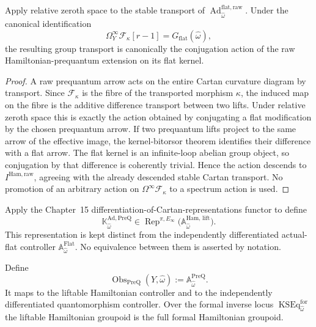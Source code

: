 \begin{proposition}
\label{prop:prequantum-flat-adjoint-conjugation-comparison}
Apply relative zeroth space to the stable transport of
$\operatorname{Ad}^{\mathrm{flat,raw}}_{\widehat\omega}$.  Under the canonical
identification
\[
\Omega_Y^\infty\mathscr F_\kappa[r-1]
=G_{\mathrm{flat}}(\widehat\omega),
\]
the resulting group transport is canonically the conjugation action of the raw
Hamiltonian-prequantum extension on its flat kernel.
\end{proposition}

\begin{proof}
A raw prequantum arrow acts on the entire Cartan curvature diagram by transport.
Since $\mathscr F_\kappa$ is the fibre of the transported morphism $\kappa$, the
induced map on the fibre is the additive difference transport between two lifts.
Under relative zeroth space this is exactly the action obtained by conjugating a
flat modification by the chosen prequantum arrow.  If two prequantum lifts project
to the same arrow of the effective image, the kernel-bitorsor theorem identifies
their difference with a flat arrow.  The flat kernel is an infinite-loop abelian
group object, so conjugation by that difference is coherently trivial.  Hence the
action descends to $I^{\mathrm{Ham,raw}}$, agreeing with the already descended
stable Cartan transport.  No promotion of an arbitrary action on
$\Omega^\infty\mathscr F_\kappa$ to a spectrum action is used.
\end{proof}

\begin{definition}
\label{constr:prequantum-tangent-representation}
Apply the Chapter~15 differentiation-of-Cartan-representations functor to define
\[
\boxed{
\mathbb K_{\widehat\omega}^{\mathrm{Ad,PreQ}}
\in
\operatorname{Rep}^{\pi,E_\infty}
\bigl(\mathbb A_{\widehat\omega}^{\mathrm{Ham,\,lift}}\bigr).
}
\]
This representation is kept distinct from the independently differentiated
actual-flat controller
$\mathbb A_{\widehat\omega}^{\mathrm{Flat}}$.  No equivalence between them is
asserted by notation.
\end{definition}

\begin{definition}
\label{def:prequantum-observable-controller}
Define
\[
\boxed{
\operatorname{Obs}_{\mathrm{PreQ}}(Y,\widehat\omega)
:=
\mathbb A_{\widehat\omega}^{\mathrm{PreQ}}.
}
\]
It maps to the liftable Hamiltonian controller and to the independently
differentiated quantomorphism controller.  Over the formal inverse locus
$\operatorname{KSEq}^{\mathrm{for}}_{\widehat\omega}$ the liftable Hamiltonian
groupoid is the full formal Hamiltonian groupoid.
\end{definition}

